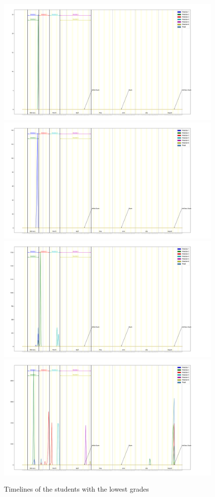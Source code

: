 \documentclass[a4paper,11pt]{report}
\numberwithin{figure}{section} %
\begin{document}
      \begin{figure}[H]
      \centering
  	  \includegraphics[width=.48\linewidth]{images/bad_timeline_7110523.png}
  	  \includegraphics[width=.48\linewidth]{images/bad_timeline_6370413.png}
      \\
      \includegraphics[width=.48\linewidth]{images/bad_timeline_5897419.png}
      \includegraphics[width=.48\linewidth]{images/bad_timeline_3905979.png}
      \caption{Timelines of the students with the lowest grades}
      \label{fig:tm1}
      \end{figure}
\end{document}
